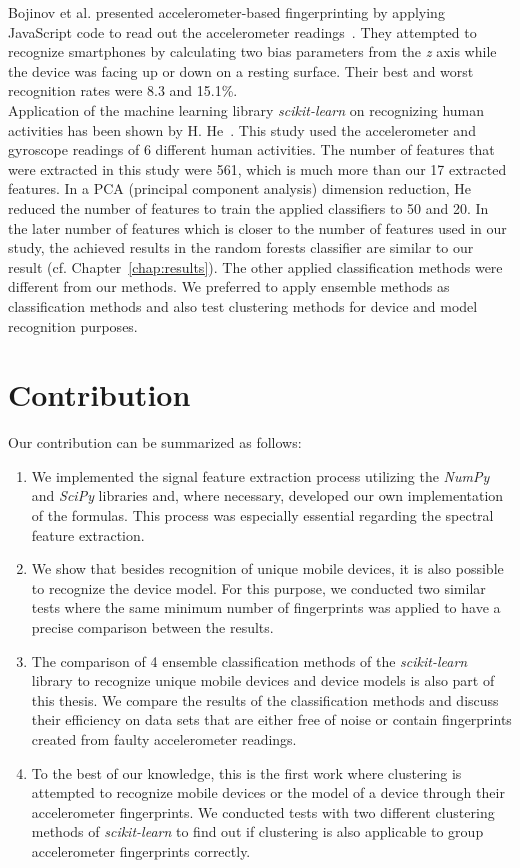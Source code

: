 Bojinov et al. presented accelerometer-based fingerprinting by applying JavaScript code to read out the accelerometer readings~\cite{bojinovmobile}. They attempted to recognize smartphones by calculating two bias parameters from the \textit{z} axis while the device was facing up or down on a resting surface. Their best and worst recognition rates were 8.3 and 15.1\%.\\
Application of the machine learning library \textit{scikit-learn} on recognizing human activities has been shown by H. He~\cite{he2013human}. This study used the accelerometer and gyroscope readings of 6 different human activities. The number of features that were extracted in this study were 561, which is much more than our 17 extracted features. In a PCA (principal component analysis) dimension reduction, He reduced the number of features to train the applied classifiers to 50 and 20. In the later number of features which is closer to the number of features used in our study, the achieved results in the random forests classifier are similar to our result (cf. Chapter~\ref{chap:results}). The other applied classification methods were different from our methods. We preferred to apply ensemble methods as classification methods and also test clustering methods for device and model recognition purposes.

\section{Contribution}
\label{ch:contribution}
Our contribution can be summarized as follows:
\begin{enumerate}
	\item We implemented the signal feature extraction process utilizing the \textit{NumPy} and \textit{SciPy} libraries and, where necessary, developed our own implementation of the formulas. This process was especially essential regarding the spectral feature extraction.
	\item We show that besides recognition of unique mobile devices, it is also possible to recognize the device model. For this purpose, we conducted two similar tests where the same minimum number of fingerprints was applied to have a precise comparison between the results.
	\item The comparison of 4 ensemble classification methods of the \textit{scikit-learn} library to recognize unique mobile devices and device models is also part of this thesis. We compare the results of the classification methods and discuss their efficiency on data sets that are either free of noise or contain fingerprints created from faulty accelerometer readings. 
	\item To the best of our knowledge, this is the first work where clustering is attempted to recognize mobile devices or the model of a device through their accelerometer fingerprints. We conducted tests with two different clustering methods of \textit{scikit-learn} to find out if clustering is also applicable to group accelerometer fingerprints correctly.
\end{enumerate}

